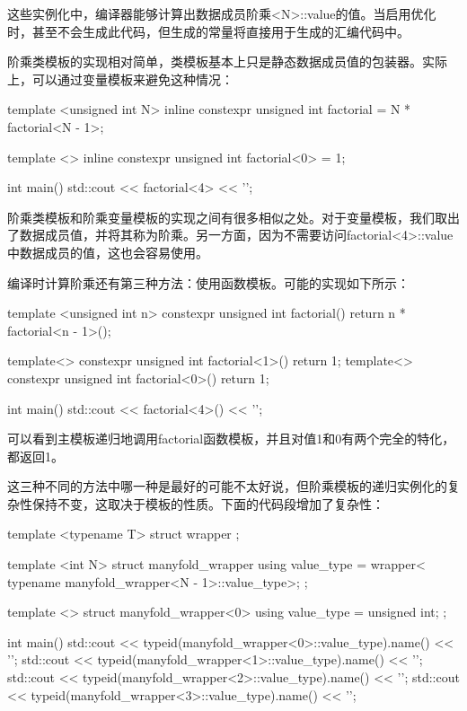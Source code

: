 这些实例化中，编译器能够计算出数据成员阶乘<N>::value的值。当启用优化时，甚至不会生成此代码，但生成的常量将直接用于生成的汇编代码中。

阶乘类模板的实现相对简单，类模板基本上只是静态数据成员值的包装器。实际上，可以通过变量模板来避免这种情况：

\begin{cpp}
template <unsigned int N>
inline constexpr unsigned int factorial = N * factorial<N - 1>;

template <>
inline constexpr unsigned int factorial<0> = 1;

int main()
{
	std::cout << factorial<4> << '\n';
}
\end{cpp}

阶乘类模板和阶乘变量模板的实现之间有很多相似之处。对于变量模板，我们取出了数据成员值，并将其称为阶乘。另一方面，因为不需要访问factorial<4>::value中数据成员的值，这也会容易使用。

编译时计算阶乘还有第三种方法：使用函数模板。可能的实现如下所示：

\begin{cpp}
template <unsigned int n>
constexpr unsigned int factorial()
{
	return n * factorial<n - 1>();
}

template<> constexpr unsigned int factorial<1>() {
												return 1; }
template<> constexpr unsigned int factorial<0>() {
												return 1; }

int main()
{
	std::cout << factorial<4>() << '\n';
}
\end{cpp}

可以看到主模板递归地调用factorial函数模板，并且对值1和0有两个完全的特化，都返回1。

这三种不同的方法中哪一种是最好的可能不太好说，但阶乘模板的递归实例化的复杂性保持不变，这取决于模板的性质。下面的代码段增加了复杂性：

\begin{cpp}
template <typename T>
struct wrapper {};

template <int N>
struct manyfold_wrapper
{
	using value_type =
		wrapper<
			typename manyfold_wrapper<N - 1>::value_type>;
};

template <>
struct manyfold_wrapper<0>
{
	using value_type = unsigned int;
};

int main()
{
	std::cout <<
		typeid(manyfold_wrapper<0>::value_type).name() << '\n';
	std::cout <<
		typeid(manyfold_wrapper<1>::value_type).name() << '\n';
	std::cout <<
		typeid(manyfold_wrapper<2>::value_type).name() << '\n';
	std::cout <<
		typeid(manyfold_wrapper<3>::value_type).name() << '\n';
}
\end{cpp}


